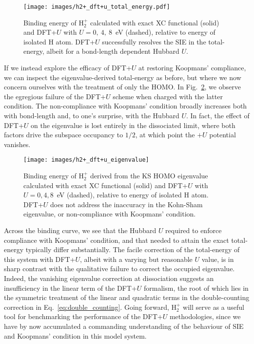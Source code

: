 { \begin{figure}[th!]
 \centering
 \texttt{[image: images/h2+\_dft+u\_total\_energy.pdf]}
 \caption[Binding energy curve of H$_2^+$ with DFT+$U$]
 {Binding energy of H$_2^+$ 
 calculated with exact XC functional (solid) and DFT+$U$ with 
$U= 0,\ 4,\ 8$~eV (dashed), 
 relative to energy of isolated H atom.
DFT+$U$ successfully resolves the SIE in the total-energy, 
albeit for a bond-length dependent Hubbard $U$.}
 \label{fig:h2+_dft+u_total_energy}
 \end{figure}


If we instead explore 
the efficacy of DFT+$U$ 
at restoring Koopmans' compliance, 
we can inspect the eigenvalue-derived 
total-energy as before, 
but where we now concern ourselves 
with the treatment of only the HOMO.
%
In Fig.~\ref{fig:h2+_dft+u_eigenvalue}, 
we observe the egregious failure 
of the DFT+$U$ scheme 
when charged with the latter condition.
%
The non-compliance with  
Koopmans' condition 
broadly increases both with 
bond-length and, 
to one's surprise, 
with the Hubbard $U$.
%
In fact, 
the effect of DFT+$U$ on 
the eigenvalue is lost entirely
in the dissociated limit, 
where both factors drive the 
subspace occupancy to $1/2$, 
at which point the $+U$ 
potential vanishes. 

 \begin{figure}[th!]
 \centering
 \texttt{[image: images/h2+\_dft+u\_eigenvalue]}
 \caption[Eigenvalue-derived binding energy of H$_2^+$ with DFT+$U$]
 {Binding energy of H$_2^+$ 
derived from the KS HOMO eigenvalue
 calculated with exact XC functional (solid) and DFT+$U$ with 
$U= 0, 4, 8$~eV (dashed), 
 relative to energy of isolated H atom.
DFT+$U$ does not address the inaccuracy in the Kohn-Sham
eigenvalue, or non-compliance with Koopmans' condition.}
 \label{fig:h2+_dft+u_eigenvalue}
 \end{figure}
 
Across the binding curve, 
we see that the Hubbard $U$ 
required to enforce compliance
with Koopmans' condition, 
and that needed to attain the 
exact total-energy typically differ substantially.
The facile correction of the 
total-energy of this system with DFT+$U$, 
albeit with a varying but reasonable $U$ value, 
is in sharp contrast with the 
qualitative {failure} to correct 
the occupied eigenvalue. 
%
Indeed, 
the {vanishing eigenvalue correction} at dissociation 
suggests an insufficiency in 
the linear term of the DFT+$U$ formalism, 
{the root of which lies in the 
symmetric treatment of the linear and quadratic 
terms in the double-counting correction  
in Eq.~\eqref{eq:double_counting}}.
%
Going forward, 
H$_2^+$ will serve as a 
useful tool for benchmarking 
the performance of 
the DFT+$U$ methodologies, 
since we have by now accumulated   
a commanding understanding  
of the behaviour of 
SIE and Koopmans' condition 
in this model system.


}
